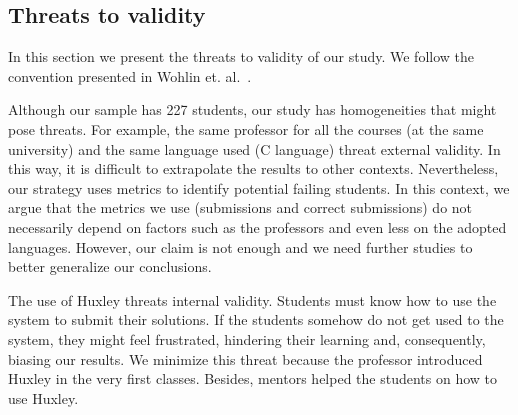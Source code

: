 


%
%

\subsection{Threats to validity}

In this section we present the threats to validity of our study. We follow the convention presented in Wohlin et. al.~\cite{claes-experimentation-se}.

Although our sample has 227 students, our study has homogeneities that might pose threats. For example, the same professor for all the \semesters courses (at the same university) and the same language used (C language) threat external validity. In this way, it is difficult to extrapolate the results to other contexts. Nevertheless, our strategy uses metrics to identify potential failing students. In this context, we argue that the metrics we use (submissions and correct submissions) do not necessarily depend on factors such as the professors and even less on the adopted languages. However, our claim is not enough and we need further studies to better generalize our conclusions.

The use of Huxley threats internal validity. Students must know how to use the system to submit their solutions. If the students somehow do not get used to the system, they might feel frustrated, hindering their learning and, consequently, biasing our results. We minimize this threat because the professor introduced Huxley in the very first classes. Besides, mentors helped the students on how to use Huxley.

